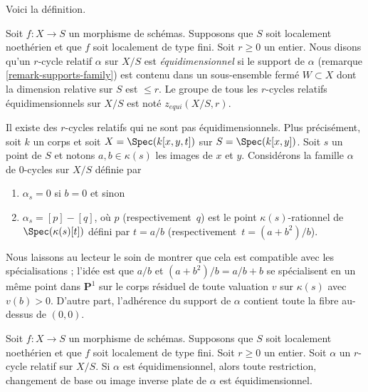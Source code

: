 \noindent
 Voici la définition. 

\begin{definition} 
\label{definition-equidimensional} 
Soit  $f : X \to S$  un morphisme de schémas. Supposons que  $S$  soit localement noethérien et
 que  $f$  soit localement de type fini. Soit $r \geq 0$  un entier. Nous disons
 qu'un  $r$-cycle relatif  $\alpha$ sur  $X/S$  est {\it équidimensionnel} si le support 
de  $\alpha$  (remarque \ref{remark-supports-family}) est
 contenu dans un sous-ensemble fermé  $W \subset X$  dont la dimension
 relative sur  $S$  est  $\leq r$.
 Le groupe de tous les  $r$-cycles relatifs équidimensionnels sur $X/S$  
est noté  $z_{equi}(X/S, r)$. 
\end{definition} 

\begin{example} 
\label{example-not-equidimensional} 
\begin{reference} 
\cite[Example 3.1.9]{SV} 
\end{reference}
 Il existe des  $r$-cycles relatifs qui ne sont pas équidimensionnels. Plus 
précisément, soit  $k$  un corps et soit  $X = \Spec(k[x, y, t])$
  sur  $S = \Spec(k[x, y])$. Soit $s$  un point de  $S$  et 
notons  $a, b \in \kappa(s)$  les images de $x$  et  $y$.
 Considérons la famille  $\alpha$  de $0$-cycles sur  $X/S$  définie par 
\begin{enumerate} 
\item $\alpha_s = 0$  si  $b = 0$  et sinon 
\item $\alpha_s = [p] - [q]$, où  $p$ (respectivement\ $q$) est le point $\kappa(s)$-rationnel
 de  $\Spec(\kappa(s)[t])$  défini par  $t = a/b$ 
(respectivement\ $t = (a + b^2)/b$). 
\end{enumerate} 
Nous laissons au lecteur le soin de montrer que cela est compatible avec les spécialisations
 ; l'idée est que  $a/b$  et  $(a + b^2)/b = a/b + b$  se spécialisent en un même point 
dans  $\mathbf{P}^1$  sur le corps résiduel de toute valuation  $v$  sur $\kappa(s)$
  avec  $v(b) > 0$. D'autre part, l'adhérence du support de $\alpha$
  contient toute la fibre au-dessus de  $(0, 0)$. 
\end{example} 

\begin{lemma} 
\label{lemma-equidimensional-functoriality} 
Soit  $f : X \to S$  un morphisme de schémas. Supposons que  $S$  soit localement noethérien et
 que  $f$  soit localement de type fini. Soit $r \geq 0$  un entier. Soit  
$\alpha$  un  $r$-cycle relatif sur $X/S$. Si  $\alpha$  est équidimensionnel, 
alors toute restriction, changement de base ou image inverse plate de  $\alpha$  est
 équidimensionnel. 
\end{lemma} 

